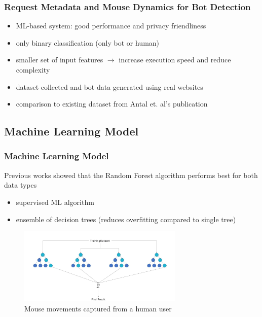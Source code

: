 \documentclass[t,aspectratio=169,table]{beamer}
\begin{document}
\begin{frame}
\frametitle{Request Metadata and Mouse Dynamics for Bot Detection}

\begin{itemize}
    \item ML-based system: good performance and privacy friendliness
    \item only binary classification (only bot or human)
    \item smaller set of input features $\rightarrow$ increase execution speed and reduce complexity
    \item dataset collected and bot data generated using real websites
    \item comparison to existing dataset from Antal et. al's publication \cite{9111596}
\end{itemize}

\end{frame}

\subsection{Machine Learning Model}
\begin{frame}
\frametitle{Machine Learning Model}

Previous works showed that the Random Forest algorithm performs best for both data types
\begin{itemize}
    \item supervised ML algorithm
    \item ensemble of decision trees (reduces overfitting compared to single tree)
\end{itemize}

\begin{figure}[H]
    \includegraphics[width=0.7\textwidth]{figures/random_forest.png}
    \caption{Mouse movements captured from a human user}
    \label{fig:user_mouse_heatmap}
\end{figure}

\end{frame}
\end{document}
